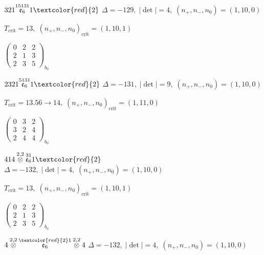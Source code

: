 \documentclass[10pt]{article}
\begin{document}
\smallskip

$321\overset{15131}{\mathfrak{e}_6}1\textcolor{red}{2}$ \quad $\Delta=-129,\; |\det|=4,\; (n_+,n_-,n_0)=(1,10,0)$

\hspace{1em}$T_{\text{crit}}=13,\; (n_+,n_-,n_0)_{\text{crit}}=(1,10,1)$

\hspace{2em}$\left(\begin{smallmatrix}0 & 2 & 2 \\ 2 & 1 & 3 \\ 2 & 3 & 5\end{smallmatrix}\right)_{\!b_0}$

\smallskip

$2321\overset{5131}{\mathfrak{e}_6}1\textcolor{red}{2}$ \quad $\Delta=-131,\; |\det|=9,\; (n_+,n_-,n_0)=(1,10,0)$

\hspace{1em}$T_{\text{crit}}=13.56 \to 14,\; (n_+,n_-,n_0)_{\text{crit}}=(1,11,0)$

\hspace{2em}$\left(\begin{smallmatrix}0 & 3 & 2 \\ 3 & 2 & 4 \\ 2 & 4 & 4\end{smallmatrix}\right)_{\!b_0}$

\smallskip

$414\overset{2,2}{\otimes}\overset{31}{\mathfrak{e}_6}1\textcolor{red}{2}$ \quad $\Delta=-132,\; |\det|=4,\; (n_+,n_-,n_0)=(1,10,0)$

\hspace{1em}$T_{\text{crit}}=13,\; (n_+,n_-,n_0)_{\text{crit}}=(1,10,1)$

\hspace{2em}$\left(\begin{smallmatrix}0 & 2 & 2 \\ 2 & 1 & 3 \\ 2 & 3 & 5\end{smallmatrix}\right)_{\!b_0}$

\smallskip

$4\overset{2,2}{\otimes}\overset{\textcolor{red}{2}1}{\mathfrak{e}_6}\overset{2,2}{\otimes}4$ \quad $\Delta=-132,\; |\det|=4,\; (n_+,n_-,n_0)=(1,10,0)$
\end{document}
